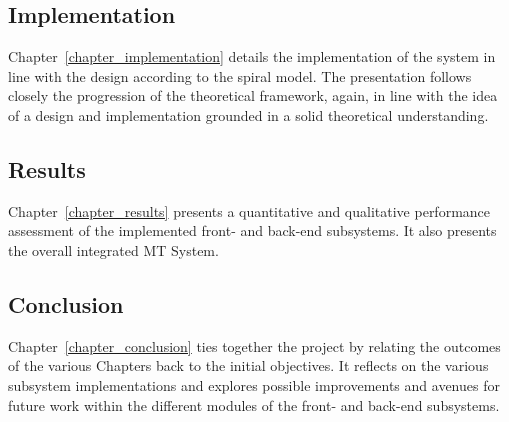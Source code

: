 \subsection{Implementation}
Chapter~\ref{chapter_implementation} details the
implementation of the system in line with the design according to the spiral
model. The presentation follows closely the progression of the theoretical
framework, again, in line with the idea of a design and implementation grounded
in a solid theoretical understanding.

\subsection{Results}
Chapter~\ref{chapter_results} presents a quantitative and
qualitative performance assessment of the implemented front- and back-end
subsystems. It also presents the overall integrated MT System. 

\subsection{Conclusion}
Chapter~\ref{chapter_conclusion} ties together the project by
relating the outcomes of the various Chapters back to the initial objectives. 
It reflects on the various subsystem implementations and explores possible
improvements and avenues for future work within the different modules of the
front- and back-end subsystems.

